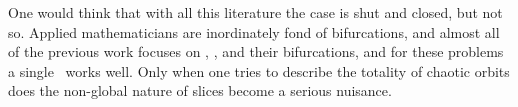 \documentclass[12pt]{article}
\newtheorem{rmark}{{\small\textsf{\textbf{Remark}}}}[section]
\newcommand{\remark}[2]{
        \begin{rmark}
        {\small\em\noindent {\small\sf #1 ~} #2 } %
    \end{rmark}
              }
\begin{document}
{One would think that with all this literature the case is
shut and closed, but not so. Applied mathematicians are
inordinately fond of bifurcations, and almost all of the
previous work focuses on \eqva, \reqva, and their
bifurcations, and for these problems a single \slice\ works
well. Only when one tries to describe the totality of chaotic
orbits does the non-global nature of slices become a serious
nuisance.

    } %



\newpage
\printbibliography[title={References}
                  ] %
\end{document}
